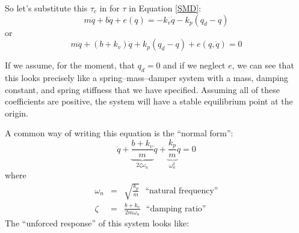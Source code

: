 \documentclass[]{article}
\begin{document}
So let's substitute this $\tau_{c}$ in for $\tau$ in Equation \ref{SMD}:
\begin{displaymath}
 m\ddot{q} + b\dot{q}+e(q) = - k_{v}\dot{q} - k_{p}(q_{d}-q)
\end{displaymath}
or
\begin{displaymath}
 m\ddot{q} + (b+k_{v})\dot{q} + k_{p}(q_{d}-q) + e(q, \dot{q}) = 0
\end{displaymath}

If we assume, for the moment, that $q_{d}=0$ and if we neglect $e$, we can see that this looks precisely like a spring--mass--damper system with a mass, damping constant, and spring stiffness that we have specified. Assuming all of these coefficients are positive, the system will have a stable equilibrium point at the origin.

A common way of writing this equation is the ``normal form'':
\begin{displaymath}
 \ddot{q} + \underbrace{\frac{b+k_{v}}{m}}_{2\zeta \omega_{n}}\dot{q} + \underbrace{\frac{k_{p}}{m}}_{\omega_{n}^{2}}q = 0
\end{displaymath}
where
\begin{eqnarray}
 \omega_{n} & = & \sqrt{\frac{k_{p}}{m}}\ \ \  \text{``natural frequency''} \nonumber \\
 \zeta & = & \frac{b+k_{v}}{2m\omega_{n}}\ \ \  \text{``damping ratio''} \nonumber
\end{eqnarray}
The ``unforced response'' of this system looks like:
\end{document}
